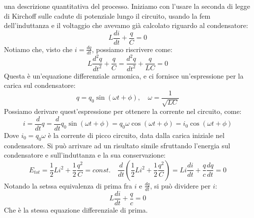 \documentclass[a4paper,12pt]{article}
\begin{document}
una descrizione quantitativa del processo. Iniziamo con l'usare la seconda di legge di Kirchoff sulle cadute di potenziale lungo il circuito,
usando la fem dell'induttanza e il voltaggio che avevamo già calcolato riguardo al condensatore:
$$ L\frac{di}{dt} + \frac{q}{C} = 0 $$
Notiamo che, visto che $i = \frac{dq}{dt}$, possiamo riscrivere come:
$$ L\frac{d^2 q}{dt^2} + \frac{q}{C} = \frac{d^2q}{dt^2} + \frac{q}{LC} = 0 $$
Questa è un'equazione differenziale armonica, e ci fornisce un'espressione per la carica sul condensatore:
$$ q = q_0\sin{(\omega t + \phi)}, \quad \omega = \frac{1}{\sqrt{LC}} $$
Possiamo derivare quest'espressione per ottenere la corrente nel circuito, come:
$$ i = \frac{d}{dt}q = \frac{d}{dt} q_0 \sin{(\omega t + \phi)} = q_0\omega \cos{(\omega t + \phi)} = i_0\cos{(\omega t + \phi)} $$
Dove $i_0 = q_0\omega$ è la corrente di picco circuito, data dalla carica iniziale nel condensatore.
Si può arrivare ad un risultato simile sfruttando l'energia sul condensatore e sull'induttanza e la sua conservazione:
$$ E_{tot} = \frac{1}{2}Li^2 + \frac{1}{2} \frac{q^2}{C} = const. \quad \frac{d}{dt}\left(  \frac{1}{2}Li^2 + \frac{1}{2} \frac{q^2}{C} \right) = Li \frac{di}{dt} + \frac{q}{c} \frac{dq}{dt} = 0$$
Notando la setssa equivalenza di prima fra $i$ e $\frac{dq}{dt}$, si può dividere per $i$:
$$ L \frac{di}{dt} + \frac{q}{c} = 0 $$
Che è la stessa equazione differenziale di prima.
\end{document}

